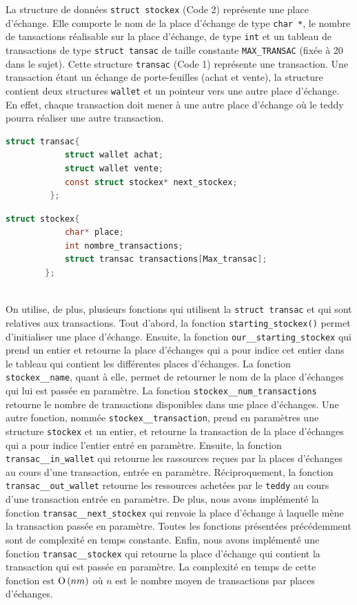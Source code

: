 \documentclass[12pt]{article}
\begin{document}
\begin{itemize}
         La structure de données \texttt{struct stockex} (Code 2) représente une place d'échange. Elle comporte le nom de la place d'échange de type \texttt{char *}, le nombre de tansactions réalisable sur la place d'échange, de type \texttt{int} et un tableau de transactions de type \texttt{struct tansac} de taille constante \texttt{MAX\_TRANSAC} (fixée à 20 dans le sujet). Cette structure \texttt{transac} (Code 1) représente une transaction. Une transaction étant un échange de porte-feuilles (achat et vente), la structure contient deux structures \texttt{wallet} et un pointeur vers une autre place d'échange. En effet, chaque transaction doit mener à une autre place d'échange où le teddy pourra réaliser une autre transaction.
         \begin{lstlisting}[language=C, caption=Structure \texttt{transac}]
         struct transac{
            struct wallet achat;
            struct wallet vente;
            const struct stockex* next_stockex;
         };\end{lstlisting}
        \begin{lstlisting}[language=C, caption=Structure \texttt{stockex}]
         struct stockex{
            char* place;
            int nombre_transactions;
            struct transac transactions[Max_transac];
        };\end{lstlisting}
        \\
        
        On utilise, de plus, plusieurs fonctions qui utilisent la \texttt{struct transac} et qui sont relatives aux transactions. Tout d'abord, la fonction \texttt{starting\_stockex()} permet d'initialiser une place d'échange. Ensuite, la fonction \texttt{our\_\_starting\_stockex} qui prend un entier et retourne la place d'échanges qui a pour indice cet entier dans le tableau qui contient les différentes places d'échanges. La fonction \texttt{stockex\_\_name}, quant à elle, permet de retourner le nom de la place d'échanges qui lui est passée en paramètre. La fonction \texttt{stockex\_\_num\_transactions} retourne le nombre de transactions disponibles dans une place d'échanges. Une autre fonction, nommée \texttt{stockex\_\_transaction}, prend en paramètres une structure \texttt{stockex} et un entier, et retourne la transaction de la place d'échanges qui a pour indice l'entier entré en paramètre.
        Ensuite, la fonction \texttt{transac\_\_in\_wallet} qui retourne les rassources reçues par la places d'échanges au cours d'une transaction, entrée en paramètre. Réciproquement, la fonction \texttt{transac\_\_out\_wallet} retourne les ressources achetées par le \texttt{teddy} au cours d'une transaction entrée en paramètre. De plus, nous avons implémenté la fonction \texttt{transac\_\_next\_stockex} qui renvoie la place d'échange à laquelle mène la transaction passée en paramètre. Toutes les fonctions présentées précédemment sont de complexité en temps constante. Enfin, nous avons implémenté une fonction \texttt{transac\_\_stockex} qui retourne la place d'échange qui contient la transaction qui est passée en paramètre. La complexité en temps de cette fonction est ${\text{O}}\left(nm\right)$ où $n$ est le nombre moyen de transactions par places d'échanges. \\
        

\end{itemize}
\end{document}
